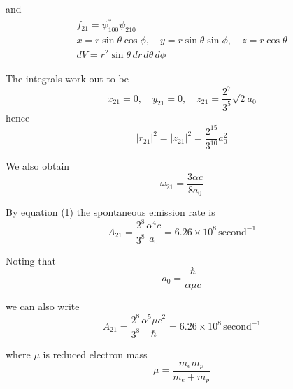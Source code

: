 and
\begin{gather*}
f_{21}=\psi_{100}^*\psi_{210}%
\\[1ex]
x=r\sin\theta\cos\phi,
\quad
y=r\sin\theta\sin\phi,
\quad
z=r\cos\theta
\\[1ex]
dV=r^2\sin\theta\,dr\,d\theta\,d\phi
\end{gather*}

The integrals work out to be
\begin{equation*}
x_{21}=0,
\quad
y_{21}=0,
\quad
z_{21}=\frac{2^7}{3^5}\sqrt2a_0
\end{equation*}
hence
\begin{equation*}
|r_{21}|^2=|z_{21}|^2=\frac{2^{15}}{3^{10}}a_0^2
\end{equation*}

We also obtain
\begin{equation*}
\omega_{21}=\frac{3\alpha c}{8a_0}
\end{equation*}

By equation (1) the spontaneous emission rate is
\begin{equation*}
A_{21}=\frac{2^8}{3^8}\frac{\alpha^4c}{a_0}=6.26\times10^8\,\text{second}^{-1}
\end{equation*}

Noting that
\begin{equation*}
a_0=\frac{\hbar}{\alpha\mu c}
\end{equation*}

we can also write
\begin{equation*}
A_{21}=\frac{2^8}{3^8}\frac{\alpha^5\mu c^2}{\hbar}=6.26\times10^8\,\text{second}^{-1}
\end{equation*}

where $\mu$ is reduced electron mass
\begin{equation*}
\mu=\frac{m_em_p}{m_e+m_p}
\end{equation*}


